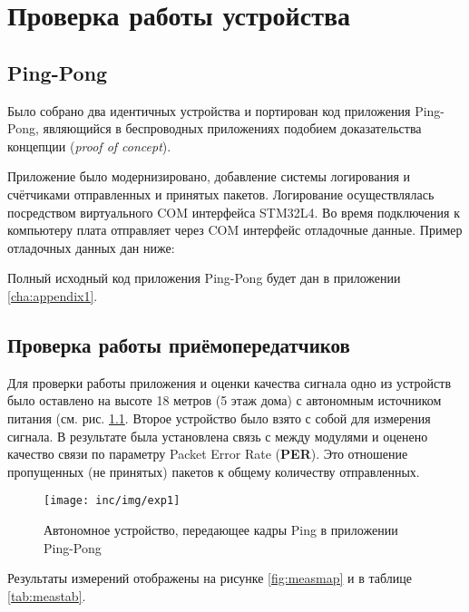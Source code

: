 \chapter{Проверка работы устройства}
\label{cha:pract}

\section{Ping-Pong}

Было собрано два идентичных устройства и портирован код приложения Ping-Pong, 
являющийся в беспроводных приложениях подобием доказательства концепции 
(\textit{proof of concept}).

Приложение было модернизировано, добавление системы логирования и счётчиками 
отправленных и принятых пакетов.
Логирование осуществлялась посредством виртуального COM интерфейса STM32L4.
Во время подключения к компьютеру плата отправляет через COM интерфейс 
отладочные данные. 
Пример отладочных данных дан ниже:

Полный исходный код приложения Ping-Pong будет дан в приложении 
\ref{cha:appendix1}.

\section{Проверка работы приёмопередатчиков}

Для проверки работы приложения и оценки качества сигнала одно из устройств было 
оставлено на высоте 18 метров (5 этаж дома) с автономным источником питания 
(см. рис. \ref{fig:exp1}.
Второе устройство было взято с собой для измерения сигнала. 
В результате была установлена связь с между модулями и оценено качество связи 
по параметру Packet Error Rate (\textbf{PER}). 
Это отношение пропущенных (не принятых) пакетов к общему количеству 
отправленных.

\begin{figure}[!h]
  \centering
  \texttt{[image: inc/img/exp1]}
  \caption{Автономное устройство, передающее кадры Ping в приложении Ping-Pong}
  \label{fig:exp1}
\end{figure}

Результаты измерений отображены на рисунке \ref{fig:measmap} и в таблице 
\ref{tab:meastab}.


